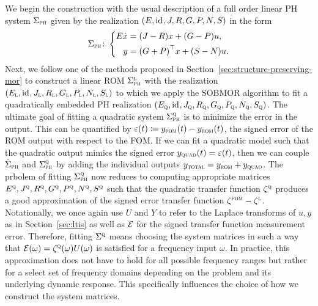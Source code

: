 We begin the construction with the usual description of a full order linear \ac{PH} system $\Sigma_{\textnormal{\scshape ph}}$ given by the realization $(E, \text{id}_{}, J, R, G, P, N, S)$ in the form
\begin{equation*}
    \Sigma_{\textnormal{\scshape ph}} \colon \left\lbrace
    \begin{aligned}
        E \dot{x} &= (J - R) x + (G - P) u, \\
        y &= {(G + P)}^{\top} x + (S - N) u.
    \end{aligned}
    \right.
\end{equation*}
Next, we follow one of the methods proposed in Section~\ref{sec:structure-preserving-mor} to construct a linear \ac{ROM} $\Sigma_{\textnormal{\scshape ph}}^{\textnormal{\scshape l}}$ with the realization $(E_{\textnormal{\scshape l}}, \text{id}_{}, J_{\textnormal{\scshape l}}, R_{\textnormal{\scshape l}}, G_{\textnormal{\scshape l}}, P_{\textnormal{\scshape l}}, N_{\textnormal{\scshape l}}, S_{\textnormal{\scshape l}})$ to which we apply the \ac{SOBMOR} algorithm to fit a quadratically embedded \ac{PH} realization $(E_{\textnormal{\scshape q}}, \text{id}_{}, J_{\textnormal{\scshape q}}, R_{\textnormal{\scshape q}}, G_{\textnormal{\scshape q}}, P_{\textnormal{\scshape q}}, N_{\textnormal{\scshape q}}, S_{\textnormal{\scshape q}})$.
The ultimate goal of fitting a quadratic system $\Sigma_{\textnormal{\scshape ph}}^{\textnormal{\scshape q}}$ is to minimize the error in the output.
This can be quantified by $\varepsilon(t) \coloneqq y_{\textnormal{\scshape fom}}(t) - y_{\textnormal{\scshape rom}}(t)$, the signed error of the \ac{ROM} output with respect to the \ac{FOM}.
If we can fit a quadratic model such that the quadratic output mimics the signed error $y_{\textnormal{\scshape quad}}(t) = \varepsilon(t)$, then we can couple $\hat{\Sigma}_{\textnormal{\scshape ph}}$ and $\Sigma_{\textnormal{\scshape ph}}^{\textnormal{\scshape q}}$ by adding the individual outputs $y_{\textnormal{\scshape total}} = y_{\textnormal{\scshape rom}} + y_{\textnormal{\scshape quad}}$.
The prbolem of fitting $\Sigma_{\textnormal{\scshape ph}}^{\textnormal{\scshape q}}$ now reduces to computing appropriate matrices $E^{\textnormal{\scshape q}}, J^{\textnormal{\scshape q}}, R^{\textnormal{\scshape q}}, G^{\textnormal{\scshape q}}, P^{\textnormal{\scshape q}}, N^{\textnormal{\scshape q}}, S^{\textnormal{\scshape q}}$ such that the quadratic transfer function $\zeta^{\textnormal{\scshape q}}$ produces a good approximation of the signed error transfer function $\zeta^{\textnormal{\scshape fom}} - \zeta^{\textnormal{\scshape l}}$.
Notationally, we once again use $U$ and $Y$ to refer to the Laplace transforms of $u, y$ as in Section~\ref{sec:ltis} as well as $\mathcal{E}$ for the signed transfer function measurement error.
Therefore, fitting $\Sigma^{\textnormal{\scshape q}}$ means choosing the system matrices in such a way that $\mathcal{E}(\omega) = \zeta^{\textnormal{\scshape q}}(\omega) U(\omega)$ is satisfied for a frequency input $\omega$.
In practice, this approximation does not have to hold for all possible frequency ranges but rather for a select set of frequency domains depending on the problem and its underlying dynamic response.
This specifically influences the choice of how we construct the system matrices.

